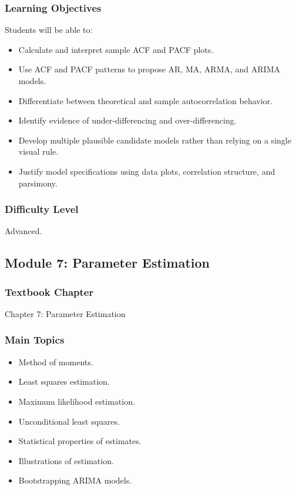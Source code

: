 \documentclass[11pt]{article}
\begin{document}
\subsubsection*{Learning Objectives}
Students will be able to:
\begin{itemize}
    \item Calculate and interpret sample ACF and PACF plots.
    \item Use ACF and PACF patterns to propose AR, MA, ARMA, and ARIMA models.
    \item Differentiate between theoretical and sample autocorrelation behavior.
    \item Identify evidence of under-differencing and over-differencing.
    \item Develop multiple plausible candidate models rather than relying on a single visual rule.
    \item Justify model specifications using data plots, correlation structure, and parsimony.
\end{itemize}

\subsubsection*{Difficulty Level}
Advanced.

\subsection{Module 7: Parameter Estimation}

\subsubsection*{Textbook Chapter}
Chapter 7: Parameter Estimation

\subsubsection*{Main Topics}
\begin{itemize}
    \item Method of moments.
    \item Least squares estimation.
    \item Maximum likelihood estimation.
    \item Unconditional least squares.
    \item Statistical properties of estimates.
    \item Illustrations of estimation.
    \item Bootstrapping ARIMA models.
\end{itemize}
\end{document}
